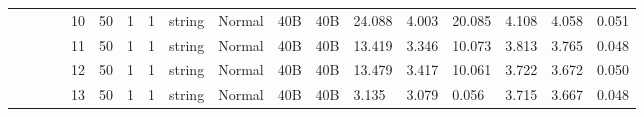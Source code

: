 \begin{landscape}
\begin{table}[]
{\begin{tabular}{@{}ccccllllllllllllll@{}}
                                                                                   &                              &                                &                                                                                                          & 10                                                    & 50                                       & 1                                          & 1                                 & string                           & Normal                             & 40B                                           & 40B                                             & 24.088                  & 4.003    & 20.085                       & 4.108                   & 4.058    & 0.051                        \\
                                                                                   &                              &                                &                                                                                                          & 11                                                    & 50                                       & 1                                          & 1                                 & string                           & Normal                             & 40B                                           & 40B                                             & 13.419                  & 3.346    & 10.073                       & 3.813                   & 3.765    & 0.048                        \\
                                                                                   &                              &                                &                                                                                                          & 12                                                    & 50                                       & 1                                          & 1                                 & string                           & Normal                             & 40B                                           & 40B                                             & 13.479                  & 3.417    & 10.061                       & 3.722                   & 3.672    & 0.050                        \\
                                                                                   &                              &                                &                                                                                                          & 13                                                    & 50                                       & 1                                          & 1                                 & string                           & Normal                             & 40B                                           & 40B                                             & 3.135                   & 3.079    & 0.056                        & 3.715                   & 3.667    & 0.048                        \\

\end{tabular}}
\end{table}
\end{landscape}
